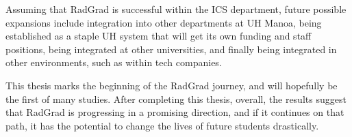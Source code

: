 Assuming that RadGrad is successful within the ICS department, future possible expansions include integration into other departments at UH Manoa, being established as a staple UH system that will get its own funding and staff positions, being integrated at other universities, and finally being integrated in other environments, such as within tech companies. 

This thesis marks the beginning of the RadGrad journey, and will hopefully be the first of many studies. After completing this thesis, overall, the results suggest that RadGrad is progressing in a promising direction, and if it continues on that path, it has the potential to change the lives of future students drastically.   